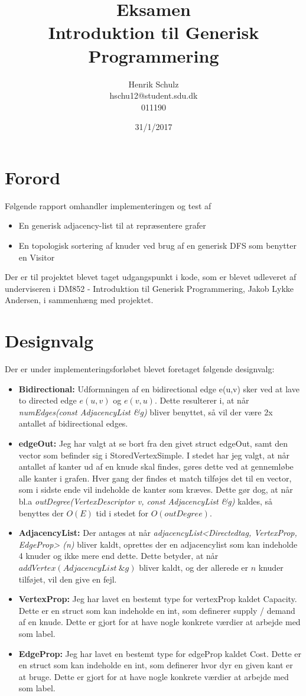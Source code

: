 \documentclass[a4paper,10pt,titlepage]{article}
\title{Eksamen\\Introduktion til Generisk Programmering}
\author{Henrik Schulz \\ hschu12@student.sdu.dk \\ 011190}
\date{31/1/2017}
\begin{document}
\maketitle
\tableofcontents
\newpage
\section{Forord}
Følgende rapport omhandler implementeringen og test af 
\begin{itemize}
\item
En generisk adjacency-list til at repræsentere grafer
\item
En topologisk sortering af knuder ved brug af en generisk DFS som benytter en Visitor
\end{itemize}
Der er til projektet blevet taget udgangspunkt i kode, som er blevet udleveret af underviseren i DM852 - Introduktion til Generisk Programmering, Jakob Lykke Andersen, i sammenhæng med projektet.
\section{Designvalg}
Der er under implementeringsforløbet blevet foretaget følgende designvalg:
\begin{itemize}
\item
\textbf{Bidirectional:} Udformningen af en bidirectional edge e(u,v) sker ved at lave to directed edge $e(u,v)$ og $e(v,u)$. Dette resulterer i, at når \textit{numEdges(const AdjacencyList \&g)} bliver benyttet, så vil der være 2x antallet af bidirectional edges.
\item
\textbf{edgeOut:} Jeg har valgt at se bort fra den givet struct edgeOut, samt den vector som befinder sig i StoredVertexSimple. I stedet har jeg valgt, at når antallet af kanter ud af en knude skal findes, gøres dette ved at gennemløbe alle kanter i grafen. Hver gang der findes et match tilføjes det til en vector, som i sidste ende vil indeholde de kanter som kræves. Dette gør dog, at når bl.a \textit{outDegree(VertexDescriptor v, const AdjacencyList \&g)} kaldes, så benyttes der $O(E)$ tid i stedet for $O(outDegree)$.
\item
\textbf{AdjacencyList:} Der antages at når \textit{adjacencyList<Directedtag, VertexProp, EdgeProp> (n)} bliver kaldt, oprettes der en adjacencylist som kan indeholde 4 knuder og ikke mere end dette. Dette betyder, at når $addVertex(AdjacencyList\ \&g)$ bliver kaldt, og der allerede er $n$ knuder tilføjet, vil den give en fejl.
\item
\textbf{VertexProp:} Jeg har lavet en bestemt type for vertexProp kaldet Capacity. Dette er en struct som kan indeholde en int, som definerer supply / demand af en knude. Dette er gjort for at have nogle konkrete værdier at arbejde med som label.
\item
\textbf{EdgeProp:} Jeg har lavet en bestemt type for edgeProp kaldet Cost. Dette er en struct som kan indeholde en int, som definerer hvor dyr en given kant er at bruge. Dette er gjort for at have nogle konkrete værdier at arbejde med som label.
\end{itemize}
\end{document}
